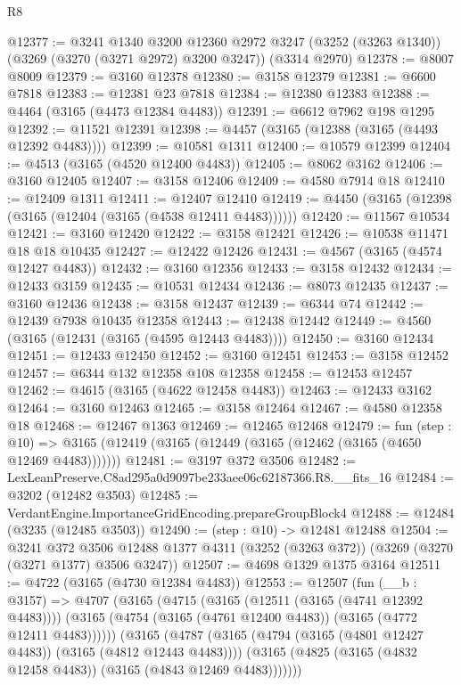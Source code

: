 \begin{lexlean}{R8}
\begin{coremodule}
@12377 := @3241
    @1340
    @3200
    @12360
    @2972
    @3247
    (@3252 (@3263 @1340))
    (@3269 (@3270 (@3271 @2972) @3200 @3247))
    (@3314 @2970)
@12378 := @8007 @8009
@12379 := @3160 @12378
@12380 := @3158 @12379
@12381 := @6600 @7818
@12383 := @12381 @23 @7818
@12384 := @12380 @12383
@12388 := @4464 (@3165 (@4473 @12384 @4483))
@12391 := @6612 @7962 @198 @1295
@12392 := @11521 @12391
@12398 := @4457 (@3165 (@12388 (@3165 (@4493 @12392 @4483))))
@12399 := @10581 @1311
@12400 := @10579 @12399
@12404 := @4513 (@3165 (@4520 @12400 @4483))
@12405 := @8062 @3162
@12406 := @3160 @12405
@12407 := @3158 @12406
@12409 := @4580 @7914 @18
@12410 := @12409 @1311
@12411 := @12407 @12410
@12419 := @4450 (@3165 (@12398 (@3165 (@12404 (@3165 (@4538 @12411 @4483))))))
@12420 := @11567 @10534
@12421 := @3160 @12420
@12422 := @3158 @12421
@12426 := @10538 @11471 @18 @18 @10435
@12427 := @12422 @12426
@12431 := @4567 (@3165 (@4574 @12427 @4483))
@12432 := @3160 @12356
@12433 := @3158 @12432
@12434 := @12433 @3159
@12435 := @10531 @12434
@12436 := @8073 @12435
@12437 := @3160 @12436
@12438 := @3158 @12437
@12439 := @6344 @74
@12442 := @12439 @7938 @10435 @12358
@12443 := @12438 @12442
@12449 := @4560 (@3165 (@12431 (@3165 (@4595 @12443 @4483))))
@12450 := @3160 @12434
@12451 := @12433 @12450
@12452 := @3160 @12451
@12453 := @3158 @12452
@12457 := @6344 @132 @12358 @108 @12358
@12458 := @12453 @12457
@12462 := @4615 (@3165 (@4622 @12458 @4483))
@12463 := @12433 @3162
@12464 := @3160 @12463
@12465 := @3158 @12464
@12467 := @4580 @12358 @18
@12468 := @12467 @1363
@12469 := @12465 @12468
@12479 := fun (step : @10) =>
  @3165 (@12419 (@3165 (@12449 (@3165 (@12462 (@3165 (@4650 @12469 @4483)))))))
@12481 := @3197 @372 @3506
@12482 := LexLeanPreserve.C8ad295a0d9097be233aee06c62187366.R8.__fits_16
@12484 := @3202 (@12482 @3503)
@12485 := VerdantEngine.ImportanceGridEncoding.prepareGroupBlock4
@12488 := @12484 (@3235 (@12485 @3503))
@12490 := (step : @10) -> @12481 @12488
@12504 := @3241
    @372
    @3506
    @12488
    @1377
    @4311
    (@3252 (@3263 @372))
    (@3269 (@3270 (@3271 @1377) @3506 @3247))
@12507 := @4698 @1329 @1375 @3164
@12511 := @4722 (@3165 (@4730 @12384 @4483))
@12553 := @12507
    (fun (__b : @3157) =>
    @4707
      (@3165
        (@4715
          (@3165 (@12511 (@3165 (@4741 @12392 @4483))))
          (@3165 (@4754 (@3165 (@4761 @12400 @4483)) (@3165 (@4772 @12411 @4483))))))
      (@3165
        (@4787
          (@3165 (@4794 (@3165 (@4801 @12427 @4483)) (@3165 (@4812 @12443 @4483))))
          (@3165 (@4825 (@3165 (@4832 @12458 @4483)) (@3165 (@4843 @12469 @4483)))))))

\end{coremodule}
\end{lexlean}
